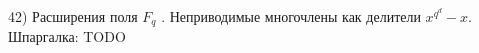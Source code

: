 42) Расширения поля $F_q$ . Неприводимые многочлены как делители $x^{q^d} - x$.\\

Шпаргалка: TODO\\
